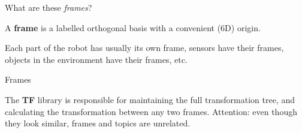 \documentclass[compress]{beamer}
\begin{document}
\begin{frame}[plain]
    \begin{center}
        \Large
        What are these \emph{frames}?
    \end{center}

    \pause

    A \textbf{frame} is a labelled orthogonal basis with a convenient (6D) origin.

    Each part of the robot has usually its own frame, sensors have their frames,
    objects in the environment have their frames, etc.
\end{frame}

\begin{frame}{Frames}
 {
    \begin{center}
    
    \end{center}
}
 {
    \begin{center}
    
    \end{center}
}

 {
    The \textbf{TF} library is responsible for maintaining the full
    transformation tree, and calculating the transformation between any two frames.
}
 {
    Attention: even though they look similar, frames and topics are unrelated.
}
\end{frame}
\end{document}
